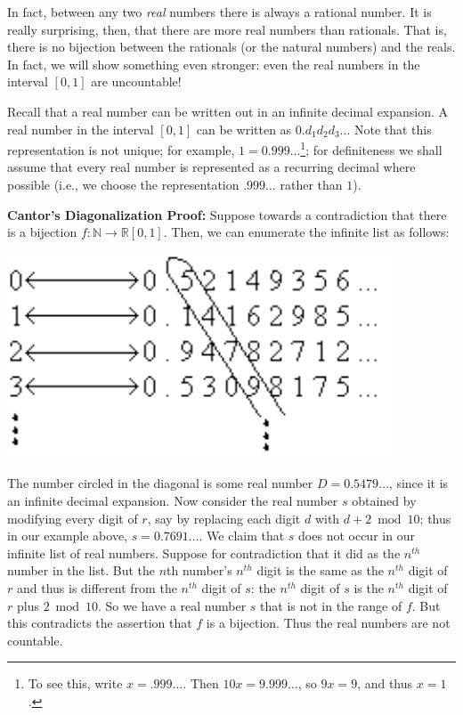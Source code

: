 \documentclass[11pt,fleqn]{article}
\begin{document}
In fact, between any two {\it real\/} numbers there is always a rational number.
It is really surprising, then, that there are more real numbers than
rationals. That is, there is no bijection between the rationals (or the
natural numbers) and the reals.
In fact, we will show something even stronger: even the real numbers
in the interval $[0,1]$ are uncountable!

Recall that a real number can be written out in an infinite decimal
expansion. A real number in the interval $[0,1]$ can be written
as $0.d_1 d_2 d_3$... Note that this representation is not unique; for example,
$1 = 0.999$...\footnote{To see this, write $x = .999 \ldots$.  Then
$10x = 9.999 \ldots$, so $9x = 9$, and thus $x=1$.}; for definiteness we
shall assume that every real number is represented as a recurring decimal
where possible (i.e., we choose the representation $.999\ldots$ rather
than $1$).

\textbf{Cantor's Diagonalization Proof:} Suppose towards a contradiction that there
is a bijection $f: \mathbb{N} \rightarrow \mathbb{R}[0,1]$.
Then, we can enumerate the infinite list as follows:

\includegraphics[bb = -40 0 0 115, scale = 0.7]{cantor}

\noindent The number circled in the diagonal is some real number
$D=0.5479\ldots$, since it is an infinite decimal expansion. Now
consider the real number $s$ obtained by modifying every digit of $r$,
say by replacing each digit $d$ with $d + 2 \bmod 10$; thus in our
example above, $s=0.7691\ldots$.  We claim that $s$ does not occur in
our infinite list of real numbers. Suppose for contradiction that it
did as the $n^{th}$ number in the list. But the $n$th number's
$n^{th}$ digit is the same as the $n^{th}$ digit of $r$ and thus is
different from the $n^{th}$ digit of $s$: the $n^{th}$ digit of $s$ is
the $n^{th}$ digit of $r$ plus $2 \bmod 10$. So we have a real number
$s$ that is not in the range of $f$. But this contradicts the
assertion that $f$ is a bijection. Thus the real numbers are not
countable.
\end{document}
